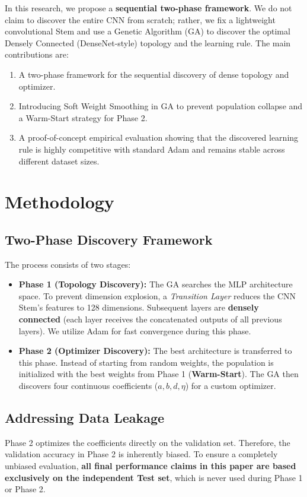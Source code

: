 \documentclass[sn-mathphys]{sn-jnl}%
\begin{document}
In this research, we propose a \textbf{sequential two-phase framework}. We do not claim to discover the entire CNN from scratch; rather, we fix a lightweight convolutional Stem and use a Genetic Algorithm (GA) to discover the optimal Densely Connected (DenseNet-style) topology and the learning rule. The main contributions are:
\begin{enumerate}
    \item A two-phase framework for the sequential discovery of dense topology and optimizer.
    \item Introducing Soft Weight Smoothing in GA to prevent population collapse and a Warm-Start strategy for Phase 2.
    \item A proof-of-concept empirical evaluation showing that the discovered learning rule is highly competitive with standard Adam and remains stable across different dataset sizes.
\end{enumerate}

\section{Methodology}\label{sec2}

\subsection{Two-Phase Discovery Framework}
The process consists of two stages:
\begin{itemize}
    \item \textbf{Phase 1 (Topology Discovery):} The GA searches the MLP architecture space. To prevent dimension explosion, a \textit{Transition Layer} reduces the CNN Stem's features to 128 dimensions. Subsequent layers are \textbf{densely connected} (each layer receives the concatenated outputs of all previous layers). We utilize Adam for fast convergence during this phase.
    \item \textbf{Phase 2 (Optimizer Discovery):} The best architecture is transferred to this phase. Instead of starting from random weights, the population is initialized with the best weights from Phase 1 (\textbf{Warm-Start}). The GA then discovers four continuous coefficients (\(a, b, d, \eta\)) for a custom optimizer.
\end{itemize}

\subsection{Addressing Data Leakage}
Phase 2 optimizes the coefficients directly on the validation set. Therefore, the validation accuracy in Phase 2 is inherently biased. To ensure a completely unbiased evaluation, \textbf{all final performance claims in this paper are based exclusively on the independent Test set}, which is never used during Phase 1 or Phase 2.
\end{document}
